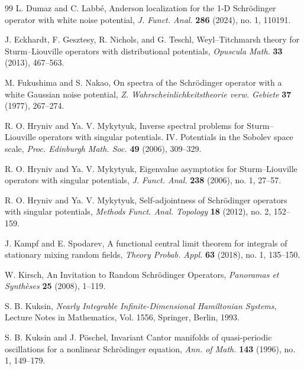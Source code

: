 \documentclass[11pt]{article}
\begin{document}
\begin{thebibliography}{99}
L. Dumaz and C. Labb\'{e},
\newblock Anderson localization for the 1-D Schr\"{o}dinger operator with white noise potential,
\newblock \emph{J. Funct. Anal.} \textbf{286} (2024), no. 1, 110191.

J. Eckhardt, F. Gesztesy, R. Nichols, and G. Teschl,
\newblock Weyl--Titchmarsh theory for Sturm--Liouville operators with distributional potentials,
\newblock \emph{Opuscula Math.} \textbf{33} (2013), 467--563.

M. Fukushima and S. Nakao,
\newblock On spectra of the Schr\"odinger operator with a white Gaussian noise potential,
\newblock \emph{Z. Wahrscheinlichkeitstheorie verw. Gebiete} \textbf{37} (1977), 267--274.

R. O. Hryniv and Ya. V. Mykytyuk,
\newblock Inverse spectral problems for Sturm--Liouville operators with singular potentials. IV. Potentials in the Sobolev space scale,
\newblock \emph{Proc. Edinburgh Math. Soc.} \textbf{49} (2006), 309--329.

R. O. Hryniv and Ya. V. Mykytyuk,
\newblock Eigenvalue asymptotics for Sturm--Liouville operators with singular potentials,
\newblock \emph{J. Funct. Anal.} \textbf{238} (2006), no. 1, 27--57.

R. O. Hryniv and Ya. V. Mykytyuk,
\newblock Self-adjointness of Schr\"odinger operators with singular potentials,
\newblock \emph{Methods Funct. Anal. Topology} \textbf{18} (2012), no. 2, 152--159.

J. Kampf and E. Spodarev,
\newblock A functional central limit theorem for integrals of stationary mixing random fields,
\newblock \emph{Theory Probab. Appl.} \textbf{63} (2018), no. 1, 135--150.

 W. Kirsch,
  \newblock An Invitation to Random Schr{\"o}dinger Operators,
  \newblock \emph{Panoramas et Synth{\`e}ses} \textbf{25} (2008), 1--119.

S. B. Kuksin,
\newblock \emph{Nearly Integrable Infinite-Dimensional Hamiltonian Systems},
\newblock Lecture Notes in Mathematics, Vol. 1556, Springer, Berlin, 1993.

S. B. Kuksin and J. P\"oschel,
\newblock Invariant Cantor manifolds of quasi-periodic oscillations for a nonlinear Schr\"odinger equation,
\newblock \emph{Ann. of Math.} \textbf{143} (1996), no. 1, 149--179.


\end{thebibliography}
\end{document}
